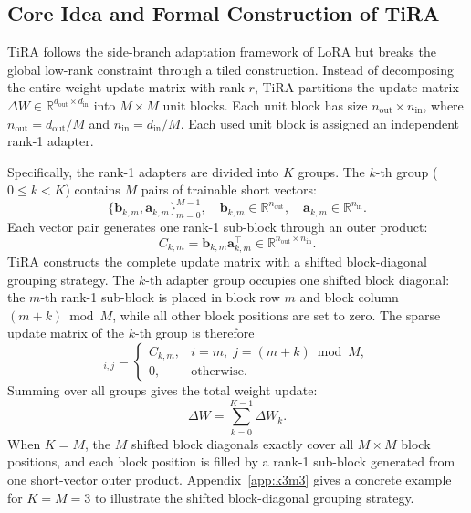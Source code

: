 \documentclass[a4paper,11pt]{article}
\newcommand{\R}{\mathbb{R}}
\newcommand{\DeltaW}{\Delta W}
\begin{document}
\subsection{Core Idea and Formal Construction of TiRA}

TiRA follows the side-branch adaptation framework of LoRA but breaks the global low-rank constraint through a tiled construction. Instead of decomposing the entire weight update matrix with rank $r$, TiRA partitions the update matrix $\DeltaW\in\R^{d_{\mathrm{out}}\times d_{\mathrm{in}}}$ into $M\times M$ unit blocks. Each unit block has size $n_{\mathrm{out}}\times n_{\mathrm{in}}$, where $n_{\mathrm{out}}=d_{\mathrm{out}}/M$ and $n_{\mathrm{in}}=d_{\mathrm{in}}/M$. Each used unit block is assigned an independent rank-1 adapter.

Specifically, the rank-1 adapters are divided into $K$ groups. The $k$-th group ($0\leq k<K$) contains $M$ pairs of trainable short vectors:
\begin{equation}
    \{\bm{b}_{k,m},\bm{a}_{k,m}\}_{m=0}^{M-1},\quad
    \bm{b}_{k,m}\in\R^{n_{\mathrm{out}}},\quad
    \bm{a}_{k,m}\in\R^{n_{\mathrm{in}}}.
\end{equation}
Each vector pair generates one rank-1 sub-block through an outer product:
\begin{equation}
    C_{k,m}=\bm{b}_{k,m}\bm{a}_{k,m}^{\top}\in\R^{n_{\mathrm{out}}\times n_{\mathrm{in}}}.
\end{equation}
TiRA constructs the complete update matrix with a shifted block-diagonal grouping strategy. The $k$-th adapter group occupies one shifted block diagonal: the $m$-th rank-1 sub-block is placed in block row $m$ and block column $(m+k)\bmod M$, while all other block positions are set to zero. The sparse update matrix of the $k$-th group is therefore
\begin{equation}
    [\Delta W_k]_{i,j}=
    \begin{cases}
        C_{k,m}, & i=m,\; j=(m+k)\bmod M,\\
        0, & \text{otherwise}.
    \end{cases}
\end{equation}
Summing over all groups gives the total weight update:
\begin{equation}
    \DeltaW = \sum_{k=0}^{K-1}\Delta W_k .
\end{equation}
When $K=M$, the $M$ shifted block diagonals exactly cover all $M\times M$ block positions, and each block position is filled by a rank-1 sub-block generated from one short-vector outer product. Appendix~\ref{app:k3m3} gives a concrete example for $K=M=3$ to illustrate the shifted block-diagonal grouping strategy.
\end{document}
